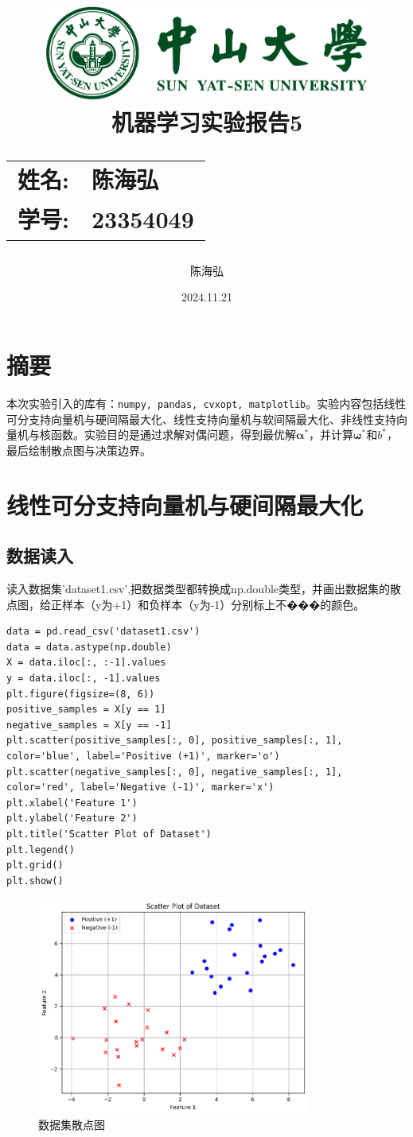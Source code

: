 \documentclass[12pt,a4paper,oneside]{article}
\date{\Large 2024.11.21}
\author{陈海弘}
\title{
    \vspace*{-2cm}
    \includegraphics[width=0.8\textwidth]{SYSULogo.pdf} \\[1em]
    \vfill
    \LARGE \textbf{机器学习实验报告5} \\[1em]
    \Large
    \begin{tabular}{rl}
        \textbf{姓名:} & \textbf{陈海弘} \\
        \textbf{学号:} & \textbf{23354049}
    \end{tabular}
    \vfill
}
\begin{document}
\maketitle
\newpage
\tableofcontents
\newpage
\section{摘要}
\qquad 本次实验引入的库有：\texttt{numpy, pandas, cvxopt, matplotlib}。实验内容包括线性可分支持向量机与硬间隔最大化、线性支持向量机与软间隔最大化、非线性支持向量机与核函数。实验目的是通过求解对偶问题，得到最优解$\bm{\alpha}^*$，并计算$\bm{\omega}^*$和$b^*$，最后绘制散点图与决策边界。
\section{线性可分支持向量机与硬间隔最大化}
\subsection{数据读入}
\qquad 读入数据集'dataset1.csv',把数据类型都转换成np.double类型，并画出数据集的散点图，给正样本（y为+1）和负样本（y为-1）分别标上不���的颜色。
\begin{lstlisting}
data = pd.read_csv('dataset1.csv')
data = data.astype(np.double)  
X = data.iloc[:, :-1].values  
y = data.iloc[:, -1].values 
plt.figure(figsize=(8, 6))
positive_samples = X[y == 1]  
negative_samples = X[y == -1] 
plt.scatter(positive_samples[:, 0], positive_samples[:, 1], color='blue', label='Positive (+1)', marker='o')
plt.scatter(negative_samples[:, 0], negative_samples[:, 1], color='red', label='Negative (-1)', marker='x')
plt.xlabel('Feature 1')
plt.ylabel('Feature 2')
plt.title('Scatter Plot of Dataset')
plt.legend()
plt.grid()
plt.show()
\end{lstlisting}

\begin{figure}[H]
    \centering
    \includegraphics[width=0.8\textwidth]{image/1.png}
    \caption{数据集散点图}
\end{figure}
\end{document}
